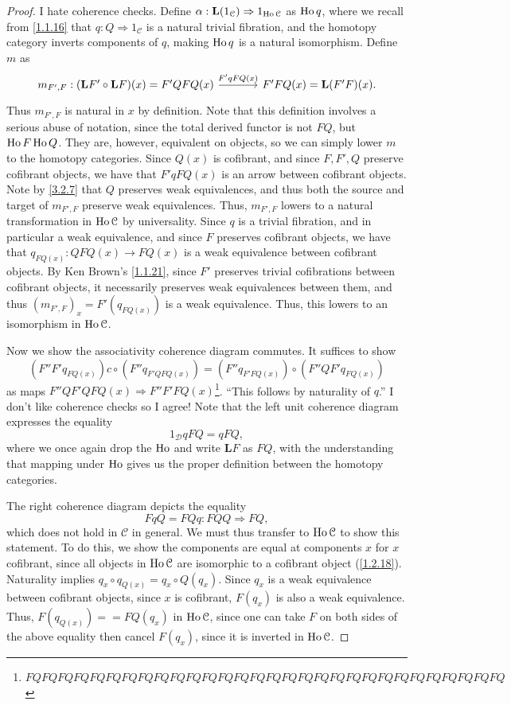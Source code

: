 \begin{proof}
	I hate coherence checks. Define $\alpha : \mathbf{L} (1_\mathcal{C} ) \Rightarrow 1_{\operatorname{Ho} \mathcal{C} } $ as $\operatorname{Ho} q$, where we recall from \ref{1.1.16} that $q : Q \Rightarrow 1_\mathcal{C} $ is a natural trivial fibration, and the homotopy category inverts components of $q$, making $\operatorname{Ho} q$ is a natural isomorphism. Define $m$ as
	\[\begin{tikzcd}[row sep = 2.5em, column sep = 3.5em]
	m_{F'\text{,} F} : (\mathbf{L} F'\circ \mathbf{L} F)(x)=F'QFQ(x)\ar[" F'qFQ(x) ", r]  & F'FQ(x)=\mathbf{L} (F'F)(x).
	\end{tikzcd}\]
	Thus $m_{F',F} $ is natural in $x$ by definition. Note that this definition involves a serious abuse of notation, since the total derived functor is not $FQ$, but $\operatorname{Ho} F\operatorname{Ho} Q$. They are, however, equivalent on objects, so we can simply lower $m$ to the homotopy categories. Since $Q(x)$ is cofibrant, and since $F,F',Q$ preserve cofibrant objects, we have that $F'qFQ(x)$ is an arrow between cofibrant objects. Note by \cref{3.2.7} that $Q$ preserves weak equivalences, and thus both the source and target of $m_{F',F} $ preserve weak equivalences. Thus, $m_{F',F} $ lowers to a natural transformation in $\operatorname{Ho} \mathcal{C} $ by universality. Since $q$ is a trivial fibration, and in particular a weak equivalence, and since $F$ preserves cofibrant objects, we have that $q_{FQ(x)} : QFQ(x) \to FQ(x)$ is a weak equivalence between cofibrant objects. By Ken Brown's \cref{1.1.21}, since $F'$ preserves trivial cofibrations between cofibrant objects, it necessarily preserves weak equivalences between them, and thus $(m_{F',F})_x=F'(q_{FQ(x)} )$ is a weak equivalence. Thus, this lowers to an isomorphism in $\operatorname{Ho} \mathcal{C} $.

	Now we show the associativity coherence diagram commutes. It suffices to show
	\[
		(F''F'q_{FQ(x)} )c\circ (F''q_{F'QFQ(x)} )=(F''q_{F'FQ(x)} )\circ (F''QF'q_{FQ(x)} )
	\]
	as maps $F''QF'QFQ(x)\Rightarrow F''F'FQ(x)$\footnote{$FQFQFQFQFQFQFQFQFQFQFQFQFQFQFQFQFQFQFQFQFQFQFQFQFQFQFQFQFQFQ$}. ``This follows by naturality of $q$.'' I don't like coherence checks so I agree! Note that the left unit coherence diagram expresses the equality
	\[
		1_{\mathcal{D} } qFQ =qFQ,
	\]
	where we once again drop the $\operatorname{Ho} $ and write $\mathbf{L} F$ as $FQ$, with the understanding that mapping under $\operatorname{Ho} $ gives us the proper definition between the homotopy categories.

	The right coherence diagram depicts the equality
	\[
		FqQ = FQq : FQQ \Rightarrow FQ,
	\]
	which does not hold in $\mathcal{C} $ in general. We must thus transfer to $\operatorname{Ho} \mathcal{C} $ to show this statement. To do this, we show the components are equal at components $x$ for $x$ cofibrant, since all objects in $\operatorname{Ho} \mathcal{C} $ are isomorphic to a cofibrant object (\cref{1.2.18}). Naturality implies $q_x\circ q_{Q(x)} =q_x\circ Q(q_x)$. Since $q_x$ is a weak equivalence between cofibrant objects, since $x$ is cofibrant, $F(q_x)$ is also a weak equivalence. Thus, $F(q_{Q(x)} )==FQ(q_x)$ in $\operatorname{Ho} \mathcal{C} $, since one can take $F$ on both sides of the above equality then cancel $F(q_x)$, since it is inverted in $\operatorname{Ho} \mathcal{C} $.
\end{proof}


